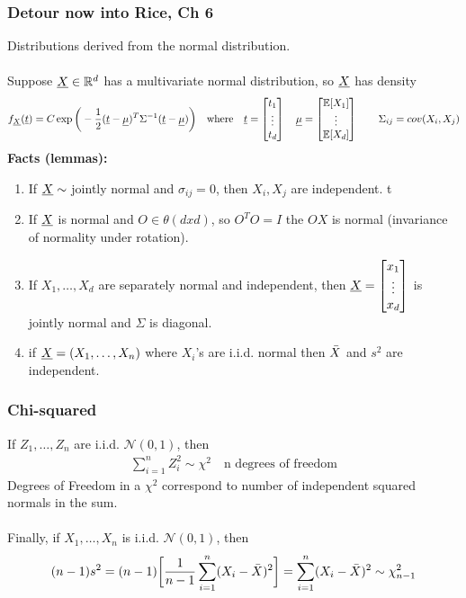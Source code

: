\subsubsection*{Detour now into Rice, Ch 6}
Distributions derived from the normal distribution.\\\\
Suppose $\underline{X} \in \mathbb{R}^d$ has a multivariate normal distribution, so $\underline{X}$ has density
\begin{gather*}
	f_{\underline{X}}(\underline{t}) = C \exp \bigg( -\frac{1}{2} (\underline{t} - \underline{\mu})^T \Sigma^{-1} (\underline{t} - \underline{\mu}) \bigg) \quad \text{where} \quad \underline{t} = \begin{bmatrix}
		t_1\\ \vdots\\ t_d
	\end{bmatrix} \quad  \underline{\mu} = \begin{bmatrix}
		\mathbb{E}[X_1]\\ \vdots \\ \mathbb{E}[X_d]
	\end{bmatrix} \qquad \Sigma_{ij} = cov(X_i, X_j) 
\end{gather*}
\textbf{Facts (lemmas):} 
\begin{enumerate}[label=\protect\circled{\arabic*}]
	\item If $\underline{X} \sim$ jointly normal and $\sigma_{ij} = 0$, then $X_i, X_j$ are independent. t
	\item If $\underline{X}$ is normal and $O \in \theta(dxd)$, so $O^T O = I$ the $OX$ is normal (invariance of normality under rotation). 
	\item If $X_1, \ldots, X_d$ are separately normal and independent, then $\underline{X} = \begin{bmatrix}
		x_1\\ \vdots\\ x_d
	\end{bmatrix}$ is jointly normal and $\Sigma$ is diagonal.
	\item if $\underline{X} = (X_1, \ldots, X_n)$ where $X_i$'s are i.i.d. normal then $\bar{X}$ and $s^2$ are independent.
\end{enumerate}
\subsubsection*{Chi-squared}
If $Z_1, \ldots, Z_n$ are i.i.d. $\mathcal{N}(0,1)$, then
\begin{gather*}
	\sum_{i=1}^n Z_i^2 \sim \chi^2 \quad \text{n degrees of freedom}	
\end{gather*}
Degrees of Freedom in a $\chi^2$ correspond to number of independent squared normals in the sum.\\\\
Finally, if $X_1, \ldots, X_n$ is i.i.d. $\mathcal{N}(0, 1)$, then
\begin{gather*}
	(n-1)s^2 = (n-1) \bigg[ \frac{1}{n-1} \sum_{i=1}^n (X_i - \bar{X})^2 \bigg] = \sum_{i=1}^n (X_i - \bar{X})^2 \sim \chi^2_{n-1}
\end{gather*}